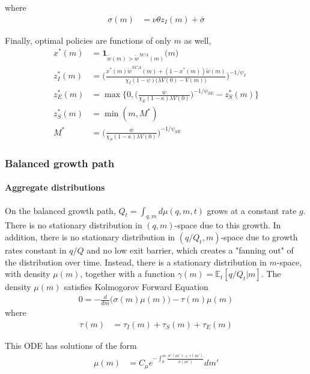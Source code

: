 \documentclass[12pt,english]{article}
\theoremstyle{remark}
\begin{document}
where
\begin{align}
		\sigma(m) &= \nu \theta z_I(m) + \bar{\sigma} 
\end{align}

Finally, optimal policies are functions of only $m$ as well, 
\begin{align}
	x^*(m) &= \textbf{1}_{\tilde{w}(m) > \tilde{w}^{NCA}(m)} \big(m\big) \\
	z_I^*(m) &= \Bigg( \frac{x^*(m) \tilde{w}^{NCA}(m) + (1-x^*(m)) \tilde{w}(m)}{\chi_I (1-\psi) \Big(\lambda V(0) - V(m) \Big)} \Bigg)^{-1/\psi_I} \\
	z_E^*(m) &= \max \Bigg\{0, \Big(\frac{\overline{w}}{\chi_E (1-\kappa) \lambda V(0)} \Big)^{-1 / \psi_{SE}} - z_S^*(m)\Bigg\} \\
	z_S^*(m) &= \min(m,M^*) \\
	M^* &= \Big(\frac{\overline{w}}{\chi_S (1-\kappa) \lambda V(0)} \Big)^{-1 / \psi_{SE}}
\end{align}

\subsubsection{Balanced growth path}\label{bgp}

\paragraph{Aggregate distributions} 

On the balanced growth path, $Q_t = \int_{q,m} d\mu(q,m,t)$ grows at a constant rate $g$. There is no stationary distribution in $(q,m)$-space due to this growth. In addition, there is no stationary distribution in $(q/Q_t,m)$-space due to growth rates constant in $q/Q$ and no low exit barrier, which creates a "fanning out" of the distribution over time. Instead, there is a stationary distribution in $m$-space, with density $\mu(m)$, together with a function $\gamma(m) = \mathbb{E}_t[q/Q_t|m]$. The density $\mu(m)$ satisfies Kolmogorov Forward Equation
\begin{align}
	0 = - \frac{d}{dm} \Big( \sigma(m) \mu(m) \Big) - \tau(m) \mu(m)  \label{KF_equation}
\end{align}
where
\begin{align}
	\tau(m) &= \tau_I(m) + \tau_S(m) + \tau_E(m) 
\end{align}

This ODE has solutions of the form
\begin{align}
	\mu(m) &= C_\mu e^{-\int_0^m \frac{\sigma'(m') + \tau(m')}{\sigma(m')}} dm' \label{KF_solution_1}
\end{align}
\end{document}
